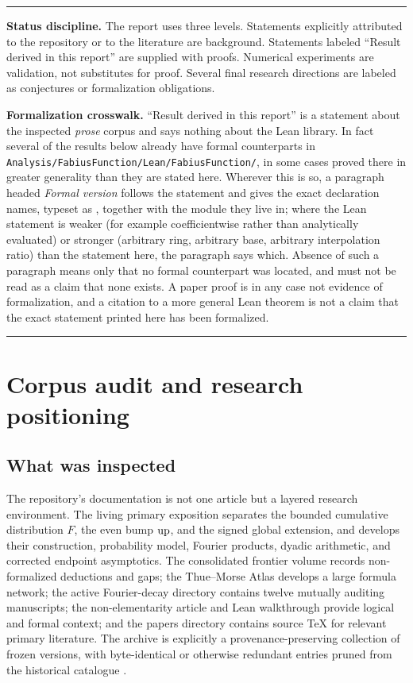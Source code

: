 \documentclass[11pt,oneside]{article}
\numberwithin{equation}{section}
\theoremstyle{definition}
\theoremstyle{remark}
\newenvironment{boxedremark}{%
  \par\smallskip\noindent\begin{center}\begin{minipage}{0.94\textwidth}%
  \color{black}\hrule\vspace{0.6em}\small
}{%
  \vspace{0.6em}\hrule\end{minipage}\end{center}\smallskip
}
\begin{document}
\begin{boxedremark}
\textbf{Status discipline.}
The report uses three levels.  Statements explicitly attributed to the repository or to the
literature are background.  Statements labeled ``Result derived in this report'' are supplied
with proofs.  Numerical experiments are validation, not substitutes for proof.  Several final
research directions are labeled as conjectures or formalization obligations.

\smallskip
\textbf{Formalization crosswalk.}
``Result derived in this report'' is a statement about the inspected \emph{prose} corpus and
says nothing about the Lean library.  In fact several of the results below already have formal
counterparts in \nolinkurl{Analysis/FabiusFunction/Lean/FabiusFunction/}, in some cases proved
there in greater generality than they are stated here.  Wherever this is so, a paragraph
headed \emph{Formal version} follows the statement and gives the exact declaration names,
typeset as , together with the module they live in; where the Lean
statement is weaker (for example coefficientwise rather than analytically evaluated) or stronger
(arbitrary ring, arbitrary base, arbitrary interpolation ratio) than the statement here, the
paragraph says which.  Absence of such a paragraph means only that no formal counterpart was
located, and must not be read as a claim that none exists.  A paper proof is in any case not
evidence of formalization, and a citation to a more general Lean theorem is not a claim that
the exact statement printed here has been formalized.
\end{boxedremark}


\clearpage

\section{Corpus audit and research positioning}
\label{p2:sec:audit}

\subsection{What was inspected}

The repository's documentation is not one article but a layered research environment.  The
living primary exposition separates the bounded cumulative distribution $F$, the even bump
$\operatorname{up}$, and the signed global extension, and develops their construction, probability model,
Fourier products, dyadic arithmetic, and corrected endpoint asymptotics.  The consolidated
frontier volume records non-formalized deductions and gaps; the Thue--Morse Atlas develops a
large formula network; the active Fourier-decay directory contains twelve mutually auditing
manuscripts; the non-elementarity article and Lean walkthrough provide logical and formal
context; and the papers directory contains source TeX for relevant primary literature.
The archive is explicitly a provenance-preserving collection of frozen versions, with
byte-identical or otherwise redundant entries pruned from the historical catalogue
\cite{p2:proveit-primary,p2:proveit-frontiers,p2:proveit-atlas,p2:proveit-fourier,p2:proveit-archive}.
\end{document}
